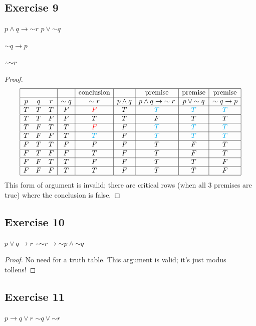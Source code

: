 \documentclass[14pt]{extarticle}
\begin{document}
\subsection{Exercise 9} $p \wedge q \to {\sim r}$
$p \vee {\sim q}$

${\sim q} \to p$

$\therefore {\sim r}$

\begin{proof} $$ \begin{array}{|ccc|c|c|c|c|c|c|} \hline & & & &
\text{conclusion} & & \text{premise} & \text{premise} & \text{premise} \\ \hline
p & q & r & {\sim q} & {\sim r} & p \wedge q & p \wedge q \to {\sim r} & p \vee
{\sim q} & {\sim q} \to p \\ \hline T & T & T & F & \color{red} F & T &
\color{cyan} T & \color{cyan} T & \color{cyan} T \\ \hline T & T & F & F & T & T
& F & T & T \\ \hline T & F & T & T & \color{red} F & F & \color{cyan} T &
\color{cyan} T & \color{cyan} T \\ \hline T & F & F & T & \color{cyan} T & F &
\color{cyan} T & \color{cyan} T & \color{cyan} T \\ \hline F & T & T & F & F & F
& T & F & T \\ \hline F & T & F & F & T & F & T & F & T \\ \hline F & F & T & T
& F & F & T & T & F \\ \hline F & F & F & T & T & F & T & T & F \\ \hline
\end{array} $$ This form of argument is invalid; there are critical rows (when
all 3 premises are true) where the conclusion is false. \end{proof}

\subsection{Exercise 10} $p \vee q \to r$
$\therefore {\sim r} \to {\sim p} \wedge {\sim q}$

\begin{proof} No need for a truth table. This argument is valid; it's just modus
tollens! \end{proof}

\subsection{Exercise 11} $p \to q \vee r$
${\sim q} \vee {\sim r}$
\end{document}
